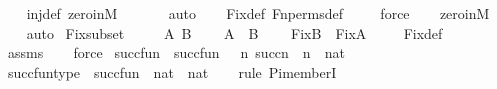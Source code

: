 \begin{isabellebody}
\ \ \isamarkupfalse%
\ inj{\isacharunderscore}{\kern0pt}def\ zero{\isacharunderscore}{\kern0pt}in{\isacharunderscore}{\kern0pt}M\isanewline
\ \ \ \ \ \isamarkupfalse%
\ auto{\isacharbrackleft}{\kern0pt}{}{\isacharbrackright}{\kern0pt}\isanewline
\ \ \isamarkupfalse%
\ Fix{\isacharunderscore}{\kern0pt}def\ Fn{\isacharunderscore}{\kern0pt}perms{\isacharunderscore}{\kern0pt}def\isanewline
\ \ \ \isamarkupfalse%
\ force\isanewline
\ \ \isamarkupfalse%
\ zero{\isacharunderscore}{\kern0pt}in{\isacharunderscore}{\kern0pt}M\isanewline
\ \ \isamarkupfalse%
\ auto%
\endisatagproof
{\isafoldproof}%
%
\isadelimproof
\isanewline
%
\endisadelimproof
\isanewline
{}\isamarkupfalse%
\ Fix{\isacharunderscore}{\kern0pt}subset\ {\isacharcolon}{\kern0pt}\ \isanewline
\ \ \ A\ B\ \isanewline
\ \ \ {\isachardoublequoteopen}A\ {\isasymsubseteq}\ B{\isachardoublequoteclose}\ \isanewline
\ \ \ {\isachardoublequoteopen}Fix{\isacharparenleft}{\kern0pt}B{\isacharparenright}{\kern0pt}\ {\isasymsubseteq}\ Fix{\isacharparenleft}{\kern0pt}A{\isacharparenright}{\kern0pt}{\isachardoublequoteclose}\ \isanewline
%
\isadelimproof
\ \ %
\endisadelimproof
%
\isatagproof
{}\isamarkupfalse%
\ Fix{\isacharunderscore}{\kern0pt}def\ \isanewline
\ \ \isamarkupfalse%
\ assms\isanewline
\ \ \isamarkupfalse%
\ force%
\endisatagproof
{\isafoldproof}%
%
\isadelimproof
\isanewline
%
\endisadelimproof
\isanewline
\isanewline
{}\isamarkupfalse%
\ succ{\isacharunderscore}{\kern0pt}fun\ \ {\isachardoublequoteopen}succ{\isacharunderscore}{\kern0pt}fun\ {\isasymequiv}\ {\isacharbraceleft}{\kern0pt}\ {\isacharless}{\kern0pt}n{\isacharcomma}{\kern0pt}\ succ{\isacharparenleft}{\kern0pt}n{\isacharparenright}{\kern0pt}{\isachargreater}{\kern0pt}\ {\isachardot}{\kern0pt}\ n\ {\isasymin}\ nat\ {\isacharbraceright}{\kern0pt}{\isachardoublequoteclose}\isanewline
\isanewline
{}\isamarkupfalse%
\ succ{\isacharunderscore}{\kern0pt}fun{\isacharunderscore}{\kern0pt}type\ {\isacharcolon}{\kern0pt}\ {\isachardoublequoteopen}succ{\isacharunderscore}{\kern0pt}fun\ {\isasymin}\ nat\ {\isasymrightarrow}\ nat{\isachardoublequoteclose}\ \isanewline
%
\isadelimproof
\ \ %
\endisadelimproof
%
\isatagproof
{}\isamarkupfalse%
{\isacharparenleft}{\kern0pt}rule\ Pi{\isacharunderscore}{\kern0pt}memberI{\isacharparenright}{\kern0pt}\isanewline

\end{isabellebody}
